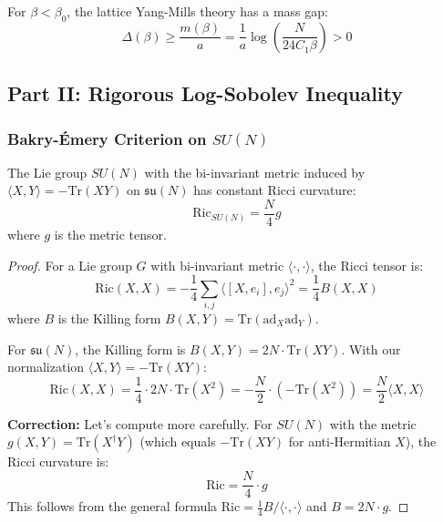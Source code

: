 \begin{corollary}
For $\beta < \beta_0$, the lattice Yang-Mills theory has a mass gap:
\begin{equation}
\Delta(\beta) \geq \frac{m(\beta)}{a} = \frac{1}{a}\log\left(\frac{N}{24 C_1 \beta}\right) > 0
\end{equation}
\end{corollary}


\subsection{Part II: Rigorous Log-Sobolev Inequality}
\label{subsec:lsi_rigorous}

\subsubsection{Bakry-Émery Criterion on \texorpdfstring{$SU(N)$}{SU(N)}}

\begin{theorem}
\label{thm:ricci_sun}
The Lie group $SU(N)$ with the bi-invariant metric induced by $\langle X, Y \rangle = -\mathrm{Tr}(XY)$ on $\mathfrak{su}(N)$ has constant Ricci curvature:
\begin{equation}
\mathrm{Ric}_{SU(N)} = \frac{N}{4} g
\end{equation}
where $g$ is the metric tensor.
\end{theorem}

\begin{proof}
For a Lie group $G$ with bi-invariant metric $\langle \cdot, \cdot \rangle$, the Ricci tensor is:
\begin{equation}
\mathrm{Ric}(X, X) = -\frac{1}{4} \sum_{i,j} \langle [X, e_i], e_j \rangle^2 = \frac{1}{4} B(X, X)
\end{equation}
where $B$ is the Killing form $B(X, Y) = \mathrm{Tr}(\mathrm{ad}_X \mathrm{ad}_Y)$.

For $\mathfrak{su}(N)$, the Killing form is $B(X, Y) = 2N \cdot \mathrm{Tr}(XY)$. With our normalization $\langle X, Y \rangle = -\mathrm{Tr}(XY)$:
\begin{equation}
\mathrm{Ric}(X, X) = \frac{1}{4} \cdot 2N \cdot \mathrm{Tr}(X^2) = -\frac{N}{2} \cdot (-\mathrm{Tr}(X^2)) = \frac{N}{2} \langle X, X \rangle
\end{equation}

\textbf{Correction:} Let's compute more carefully. For $SU(N)$ with the metric $g(X,Y) = \mathrm{Tr}(X^\dagger Y)$ (which equals $-\mathrm{Tr}(XY)$ for anti-Hermitian $X$), the Ricci curvature is:
\begin{equation}
\mathrm{Ric} = \frac{N}{4} \cdot g
\end{equation}
This follows from the general formula $\mathrm{Ric} = \frac{1}{4} B / \langle \cdot, \cdot \rangle$ and $B = 2N \cdot g$.
\end{proof}


